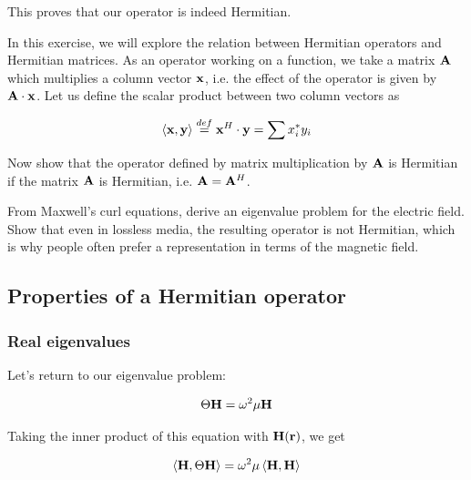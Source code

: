 This proves that our operator is indeed Hermitian.

\begin{sidebar}
\begin{ex}
In this exercise, we will explore the relation between Hermitian operators and Hermitian matrices. As an operator working on a function, we take a matrix ${\bf A}$ which multiplies a column vector ${\bf x}$, i.e. the effect of the operator is given by ${\bf A} \cdot {\bf x}$. Let us define the scalar product between two column vectors as

$$\left\langle {\bf x},{\bf y} \right\rangle \stackrel{def}{=} {\bf x}^H \cdot {\bf y} = \sum{x_i^* y_i}$$

Now show that the operator defined by matrix multiplication by ${\bf A}$ is Hermitian if the matrix ${\bf A}$ is Hermitian, i.e. ${\bf A} = {\bf A}^H$.
\end{ex}
\end{sidebar}

\begin{sidebar}
\begin{ex}
From Maxwell's curl equations, derive an eigenvalue problem for the electric field. Show that even in lossless media, the resulting operator is not Hermitian, which is why people often prefer a representation in terms of the magnetic field.
\end{ex}
\end{sidebar}


\subsection{Properties of a Hermitian operator}

\subsubsection{Real eigenvalues}

Let's return to our eigenvalue problem:

\begin{equation}
\Theta {\bf H} = \omega^2 \mu {\bf H}
\end{equation} 

Taking the inner product of this equation with ${\bf H({\bf r})}$, we get

\begin{equation}
\left\langle{\bf H} , \Theta {\bf H}\right\rangle  = \omega^2 \mu \left\langle {\bf H} , {\bf H}\right\rangle \label{eq-real-eigen-1}
\end{equation}

